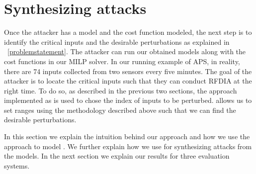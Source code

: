 \section{Synthesizing attacks}
Once the attacker has a model and the cost function modeled, the next step is to identify the critical inputs and the desirable perturbations as explained in ~\ref{problemstatement}.
The attacker can run our obtained models along with the cost functions in our \ac{MILP} solver. 
In our running example of APS, in reality, there are 74 inputs collected from two sensors every five minutes.
 The goal of the attacker is to locate the critical inputs such that they can conduct \ac{RFDIA} at the right time.
 To do so, as described in the previous two sections, the approach implemented as \tool is used to chose the index of inputs to be perturbed.
 \tool allows us to set ranges using the methodology described above such that we can find the desirable perturbations. 
 

In this section we explain the intuition behind our approach and how we use the approach to model \tool. 
We further explain how we use \tool for synthesizing attacks from the models. 
In the next section we explain our results for three evaluation systems. 

